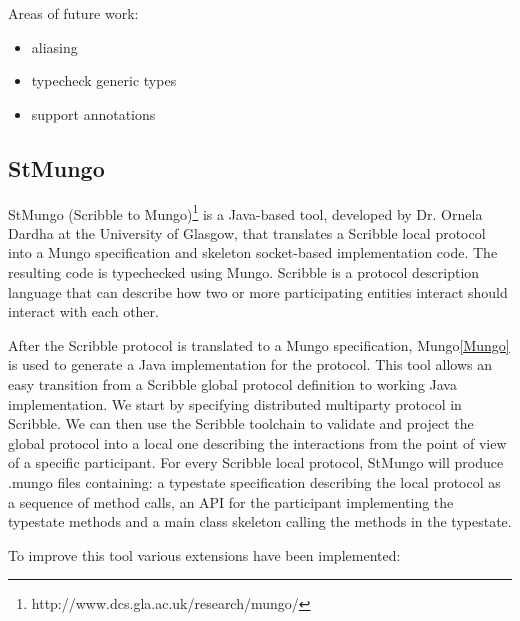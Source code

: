 Areas of future work:
\begin{itemize}
  \item aliasing
  \item typecheck generic types
  \item support annotations
\end{itemize}

\subsection{StMungo}
\label{sub:StMungo}

StMungo (Scribble to Mungo)\footnote{http://www.dcs.gla.ac.uk/research/mungo/} is a Java-based tool, developed by Dr. Ornela Dardha at the University of Glasgow, that translates a Scribble\cite{scribble, YHNN2013} local protocol into a Mungo specification and skeleton socket-based implementation code. The resulting code is typechecked using Mungo. Scribble is a protocol description language that can describe how two or more participating entities interact should interact with each other. 



After the Scribble protocol is translated to a Mungo specification, Mungo\ref{Mungo} is used to generate a Java implementation for the protocol. This tool allows an easy transition from a Scribble global protocol definition to working Java implementation. We start by specifying distributed multiparty protocol in Scribble. We can then use the Scribble toolchain to validate and project the global protocol into a local one describing the interactions from the point of view of a specific participant. For every Scribble local protocol, StMungo will produce .mungo files containing: a typestate specification describing the local protocol as a sequence of method calls, an API for the participant implementing the typestate methods and a main class skeleton calling the methods in the typestate.

To improve this tool various extensions have been implemented:

